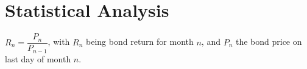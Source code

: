 \chapter{Statistical Analysis} \label{chapter:statistical-analysis}
$R_{n} = \dfrac{P_{n}}{P_{n-1}}$, with $R_{n}$ being bond return for month $n$, and $P_{n}$ the bond price on last day of month $n$. 





